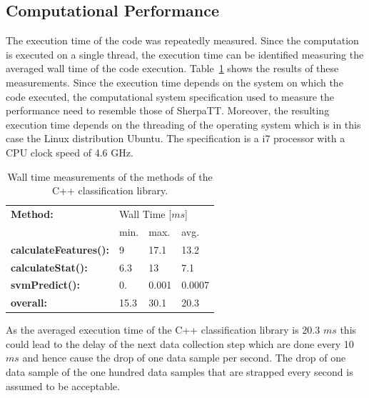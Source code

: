 \documentclass{article}
\begin{document}


\subsection{Computational Performance}

The execution time of the code was repeatedly measured. Since the computation is executed on a single thread, the execution time can be identified measuring the averaged wall time of the code execution. Table~\ref{table:compmeasurments} shows the results of these measurements. Since the execution time depends on the system on which the code executed, the computational system specification used to measure the performance need to resemble those of SherpaTT. Moreover, the resulting execution time depends
on the threading of the operating system which is in this case the Linux distribution Ubuntu. The specification is a i7 processor with a CPU clock speed of 4.6 GHz. 

\begin{table}[htb!]
   \centering
    \begin{tabularx}{\columnwidth}{X|XXX}
        \textbf{Method:} & \multicolumn{3}{X}{Wall Time [$ms$]} \\
        &min.&max.&avg.\\
        \hline
        \hline
        \textbf{calculateFeatures():} & 9&  17.1& 13.2 \\
        \textbf{calculateStat():}     & 6.3 & 13 & 7.1 \\
        \textbf{svmPredict():}        &  0. &  0.001 & 0.0007  \\
        \hline
        \textbf{overall:}             & 15.3 & 30.1 &20.3  \\
    \end{tabularx}	
    \caption{Wall time measurements of the methods of the C++ classification library.}
    \label{table:compmeasurments}
\end{table}

As the averaged execution time of the C++ classification library is 20.3 $ms$ this could lead to the delay of the next data collection step which are done every 10 $ms$ and hence cause the drop of one data sample per second. The drop of one data sample of the one hundred data samples that are strapped every second is assumed to be acceptable.
\end{document}
